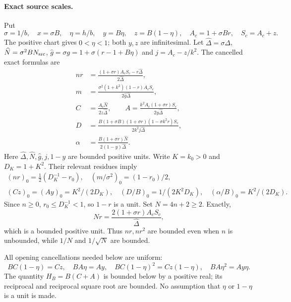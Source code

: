 \paragraph{Exact source scales.}
Put
\[
 \sigma=1/b,\quad x=\sigma B,\quad \eta=h/b,\quad
 y=B\eta,\quad z=B(1-\eta),\quad
 A_c=1+\sigma Br,\quad S_c=A_c+z.
\]
The positive chart gives $0<\eta<1$; both $y,z$ are infinitesimal.
Let $\widehat\Delta=\sigma\Delta$,
$\widehat N=\sigma^2 B N_{\rm src}$,
$\widehat g=\sigma g=1+\sigma(r-1+B\eta)$ and
$j=A_c-z/k^2$.  The cancelled exact formulas are
\begin{align*}
 nr&=\frac{(1+\sigma r)A_cS_c-r\widehat\Delta}
                       {2\widehat\Delta},\\
 m&=\frac{\sigma^2(1+k^2)(1-r)A_cS_c}
                       {2\widehat g\widehat\Delta},\\
 C&=\frac{A_c\widehat N}{2z\widehat\Delta},\qquad
 A=\frac{k^2A_c(1+\sigma r)S_c}{2y\widehat\Delta},\\
 D&=\frac{B(1+\sigma B)(1+\sigma r)(1-\sigma k^2r)S_c}
                       {2k^2j\widehat\Delta},\\
 \alpha&=\frac{B(1+\sigma r)\widehat N}
                       {2(1-y)\widehat\Delta}.
                                                               \tag{UB1}
\end{align*}
Here $\widehat\Delta,\widehat N,\widehat g,j,1-y$ are bounded
positive units.  Write $K=k_0>0$ and $D_K=1+K^2$.  Their relevant
residues imply
\begin{gather*}
 (nr)_0=\tfrac12(D_K^{-1}-r_0),\quad
 (m/\sigma^2)_0=(1-r_0)/2,\\
 (Cz)_0=(Ay)_0=K^2/(2D_K),\quad
 (D/B)_0=1/(2K^2D_K),\quad
 (\alpha/B)_0=K^2/(2D_K).                            \tag{UB2}
\end{gather*}
Since $n\geq0$, $r_0\leq D_K^{-1}<1$, so $1-r$ is a unit.
Set $N=4n+2\geq2$.  Exactly,
\[
 Nr=\frac{2(1+\sigma r)A_cS_c}{\widehat\Delta},      \tag{UB3}
\]
which is a bounded positive unit.  Thus $nr,nr^2$ are bounded even
when $n$ is unbounded, while $1/N$ and $1/\sqrt N$ are bounded.

All opening cancellations needed below are uniform:
\[
 BC(1-\eta)=Cz,\quad BA\eta=Ay,\quad
 BC(1-\eta)^2=Cz(1-\eta),\quad BA\eta^2=Ay\eta.
                                                               \tag{UB4}
\]
The quantity $H_B=B(C+A)$ is bounded below by a positive real;
its reciprocal and reciprocal square root are bounded.  No
assumption that $\eta$ or $1-\eta$ is a unit is made.

